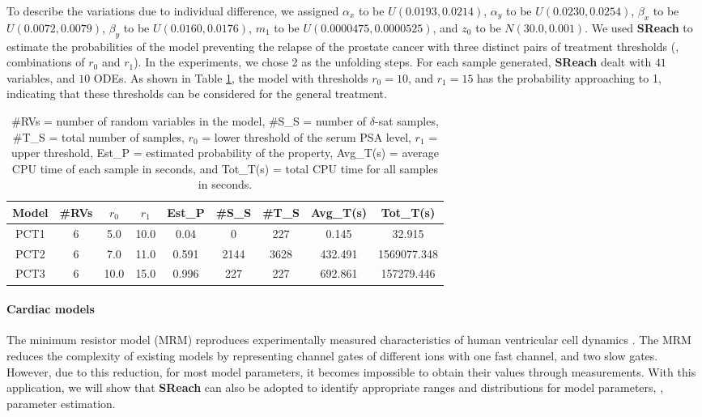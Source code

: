 To describe the variations due to individual difference, we assigned $\alpha_x$ to be $U(0.0193, 0.0214)$, $\alpha_y$ to be $U(0.0230, 0.0254)$, $\beta_x$ to be $U(0.0072, 0.0079)$, $\beta_y$ to be $U(0.0160, 0.0176)$, $m_1$ to be $U(0.0000475, 0.0000525) $, and $z_0$ to be $N(30.0, 0.001)$. 
We used {\bf SReach} to estimate the probabilities of the model preventing the relapse of the prostate cancer with three distinct pairs of treatment thresholds (\ie, combinations of $r_0$ and $r_1$).  In the experiments, we chose 2 as the unfolding steps. For each sample generated, {\bf SReach} dealt with $41$ variables, and $10$ ODEs. As shown in Table \ref{table:prostate}, the model with thresholds $r_0 = 10$, and $r_1 = 15$ has the probability approaching to 1, indicating that these thresholds can be considered for the general treatment. 
\begin{table}[h]
\captionsetup{font=scriptsize}
\centering
    \begin{tabular}{c|c|c|c|c|c|c|c|c}
    \hline
    Model & \#RVs & $r_0$ & $r_1$ & Est\_P & \#S\_S & \#T\_S & Avg\_T(s) & Tot\_T(s) \\ \hline
    PCT1  & 6     & 5.0  & 10.0 & 0.04   & 0      & 227    & 0.145   & 32.915     \\ \hline
    PCT2  & 6     & 7.0  & 11.0 & 0.591  & 2144   & 3628   & 432.491 & 1569077.348     \\ \hline
    PCT3  & 6     & 10.0 & 15.0 & 0.996  & 227    & 227    & 692.861   & 157279.446   \\ \hline
    \end{tabular}
    \caption{\#RVs = number of random variables in the model, \#S\_S = number of $\delta$-sat samples, 
\#T\_S = total number of samples, $r_0$ = lower threshold of the serum PSA level, $r_1$ = upper threshold, 
Est\_P = estimated probability of the property,  Avg\_T(s) = average CPU time of each sample in seconds, and Tot\_T(s) = total CPU time for all samples in seconds.}
    \label{table:prostate}
\end{table}


\paragraph{\bf Cardiac models}
The minimum resistor model (MRM) reproduces experimentally measured characteristics 
of human ventricular cell dynamics \cite{bueno2008minimal}. 
The MRM reduces the complexity of existing models by representing channel gates of different ions with one fast channel, and two slow gates. However, due to this reduction, for most model parameters, it becomes impossible to obtain their values through measurements. With this application, we will show that {\bf SReach} can also be adopted to identify appropriate ranges and distributions for model parameters, \ie, parameter estimation.

